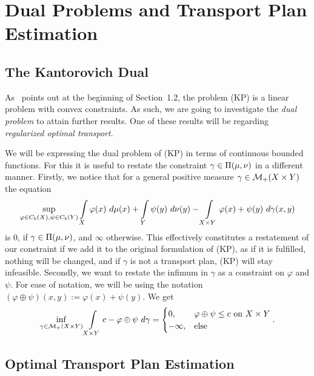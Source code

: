 \chapter{Dual Problems and Transport Plan Estimation}\label{DualPlanEst}

\section{The Kantorovich Dual}\label{KanDual}


As~\cite{San2015} points out at the beginning of Section~1.2, the problem (KP) is a linear problem with convex constraints. As such, we are going to investigate the \textit{dual problem} to attain further results. One of these results will be regarding \textit{regularized optimal transport}.


We will be expressing the dual problem of (KP) in terms of continuous bounded functions. For this it is useful to restate the constraint $\gamma \in \TP{\mu}{\nu}$ in a different manner. Firstly, we notice that for a general positive measure $\gamma \in \M[+]{X \times Y}$ the equation
\[ \sup\limits_{\varphi \in \CF[b]{X}, \psi \in \CF[b]{Y}} \int\limits_X \varphi(x)~d\mu(x) + \int\limits_Y \psi(y)~d\nu(y) - \int\limits_{X \times Y} \varphi(x) + \psi(y)~d\gamma(x, y) \]
is $0$, if $\gamma \in \TP{\mu}{\nu}$, and $\infty$ otherwise. This effectively constitutes a restatement of our constraint if we add it to the original formulation of (KP), as if it is fulfilled, nothing will be changed, and if $\gamma$ is not a transport plan, (KP) will stay infeasible. Secondly, we want to restate the infimum in $\gamma$ as a constraint on $\varphi$ and $\psi$. For ease of notation, we will be using the notation $(\varphi \oplus \psi)(x, y) := \varphi(x) + \psi(y)$. We get
\[ \inf\limits_{\gamma \in \M[+]{X \times Y}} \int\limits_{X \times Y} c - \varphi \oplus \psi~d\gamma = 
\begin{cases}
	0, & \varphi \oplus \psi \le c \text{ on } X \times Y \\
	- \infty, & \text{else}
\end{cases}. \]


\section{Optimal Transport Plan Estimation}\label{OTPlanEst}

